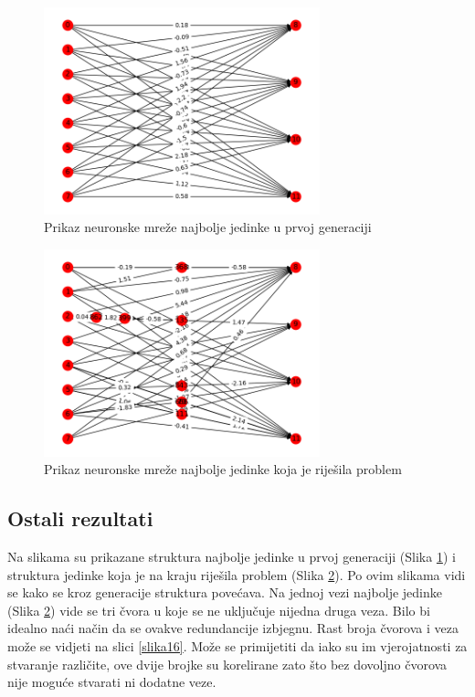 \documentclass[times, utf8, diplomski, numeric]{fer}
\begin{document}
\begin{figure}
  \centering
  \includegraphics[height=6cm]{slika14}
  \caption{Prikaz neuronske mreže najbolje jedinke u prvoj generaciji}
  \label{slika14}
\end{figure}

\begin{figure}
  \centering
  \includegraphics[height=6cm]{slika15}
  \caption{Prikaz neuronske mreže najbolje jedinke koja je riješila problem}
  \label{slika15}
\end{figure}

\subsection{Ostali rezultati}
Na slikama su prikazane struktura najbolje jedinke u prvoj generaciji (Slika \ref{slika14}) i struktura jedinke koja je na kraju riješila problem (Slika \ref{slika15}). Po ovim slikama vidi se kako se kroz generacije struktura povećava. Na jednoj vezi najbolje jedinke (Slika \ref{slika15}) vide se tri čvora u koje se ne uključuje nijedna druga veza. Bilo bi idealno naći način da se ovakve redundancije izbjegnu. Rast broja čvorova i veza može se vidjeti na slici \ref{slika16}. Može se primijetiti da iako su im vjerojatnosti za stvaranje različite, ove dvije brojke su korelirane zato što bez dovoljno čvorova nije moguće stvarati ni dodatne veze.
\end{document}
